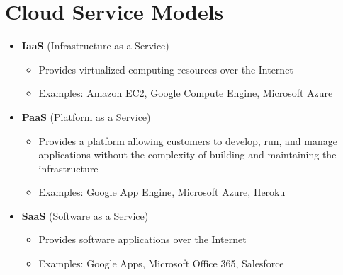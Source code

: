 \section{Cloud Service Models}
\begin{itemize}
   \item \textbf{IaaS} (Infrastructure as a Service)
   \begin{itemize}
      \item Provides virtualized computing resources over the Internet
      \item Examples: Amazon EC2, Google Compute Engine, Microsoft Azure
   \end{itemize}
   \item \textbf{PaaS} (Platform as a Service)
   \begin{itemize}
      \item Provides a platform allowing customers to develop, run, and manage applications without the complexity of building and maintaining the infrastructure
      \item Examples: Google App Engine, Microsoft Azure, Heroku
   \end{itemize}
   \item \textbf{SaaS} (Software as a Service)
   \begin{itemize}
      \item Provides software applications over the Internet
      \item Examples: Google Apps, Microsoft Office 365, Salesforce
   \end{itemize}


\end{itemize}
